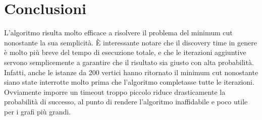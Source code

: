 \documentclass[a4paper]{article}
\begin{document}
\section{Conclusioni}
L'algoritmo risulta molto efficace a risolvere il problema del minimum cut nonostante la sua semplicità. È interessante notare che il discovery time in genere è molto più breve del tempo di esecuzione totale, e che le iterazioni aggiuntive servono semplicemente a garantire che il risultato sia giusto con alta probabilità. Infatti, anche le istanze da 200 vertici hanno ritornato il minimum cut nonostante siano state interrotte molto prima che l'algoritmo completasse tutte le iterazioni. Ovviamente imporre un timeout troppo piccolo riduce drasticamente la probabilità di successo, al punto di rendere l'algoritmo inaffidabile e poco utile per i grafi più grandi.
\end{document}
